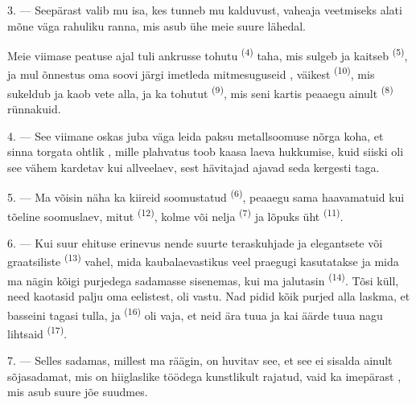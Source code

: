 3. --- Seepärast valib mu isa, kes tunneb mu kalduvust, vaheaja veetmiseks alati mõne
väga rahuliku ranna, mis asub ühe meie suure  lähedal.

Meie viimase peatuse ajal tuli  ankrusse tohutu 
\textsuperscript{(4)} taha, mis sulgeb ja kaitseb 
\textsuperscript{(5)}, ja mul õnnestus oma soovi järgi imetleda mitmesuguseid
, väikest  \textsuperscript{(10)}, mis sukeldub ja
kaob vete alla, ja ka tohutut  \textsuperscript{(9)}, mis seni kartis
peaaegu ainult  \textsuperscript{(8)} rünnakuid.

\VUsaut{3.0mm}
\VUsaut{3.0mm}

4. --- See viimane oskas juba väga  leida paksu metallsoomuse nõrga
koha, et sinna torgata ohtlik , mille plahvatus toob kaasa laeva
hukkumise, kuid siiski oli see vähem kardetav kui allveelaev, sest hävitajad ajavad
seda kergesti taga.

5. --- Ma võisin näha ka kiireid soomustatud  \textsuperscript{(6)},
peaaegu sama haavamatuid kui tõeline soomuslaev, mitut 
\textsuperscript{(12)}, kolme või nelja  \textsuperscript{(7)} ja
lõpuks üht  \textsuperscript{(11)}. 

6. --- Kui suur ehituse erinevus nende suurte teraskuhjade ja elegantsete
 või graatsiliste  \textsuperscript{(13)}
vahel, mida kaubalaevastikus veel praegugi kasutatakse ja mida ma nägin kõigi
purjedega sadamasse sisenemas, kui ma jalutasin  \textsuperscript{(14)}.
Tõsi küll, need kaotasid palju oma eelistest,   oli vastu. Nad
pidid kõik purjed alla laskma, et basseini tagasi tulla, ja 
\textsuperscript{(16)} oli vaja, et neid ära tuua ja kai äärde tuua nagu lihtsaid
 \textsuperscript{(17)}.

\VUsaut{3.0mm}
\VUsaut{3.0mm}

7. --- Selles sadamas, millest ma räägin, on huvitav see, et see ei sisalda ainult
sõjasadamat, mis on hiiglaslike töödega kunstlikult rajatud, vaid ka imepärast
, mis asub suure jõe suudmes.

